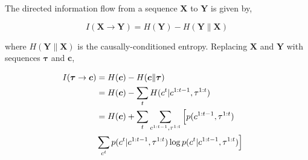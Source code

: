 \documentclass{article} %
\begin{document}
The directed information flow from a sequence $\boldsymbol{X}$ to $\boldsymbol{Y}$ is given by,

\begin{equation*}
I(\boldsymbol{X} \rightarrow \boldsymbol{Y}) = H(\boldsymbol{Y}) - H(\boldsymbol{Y} \| \boldsymbol{X})    
\end{equation*}

where $H(\boldsymbol{Y} \| \boldsymbol{X})$ is the causally-conditioned entropy. Replacing $\boldsymbol{X}$ and $\boldsymbol{Y}$ with sequences $\boldsymbol{\tau}$ and $\boldsymbol{c}$,

\begin{align}
\footnotesize
I(\boldsymbol{\tau} \rightarrow \boldsymbol{c}) &= H(\boldsymbol{c}) - H(\boldsymbol{c} \| \boldsymbol{\tau})& &\nonumber \\
&= H(\boldsymbol{c}) - \sum_{t}H(c^{t}|c^{1:t-1}, \tau^{1:t})& & \nonumber \\
&= H(\boldsymbol{c}) + \sum_{t} \sum_{c^{1:t-1}, \tau^{1:t}} \Big[ p(c^{1:t-1}, \tau^{1:t}) & &\nonumber \\
& \sum_{c^{t}} p(c^{t} | c^{1:t-1}, \tau^{1:t}) \log p(c^{t} | c^{1:t-1}, \tau^{1:t})\Big]  
\end{align}


\end{document}
